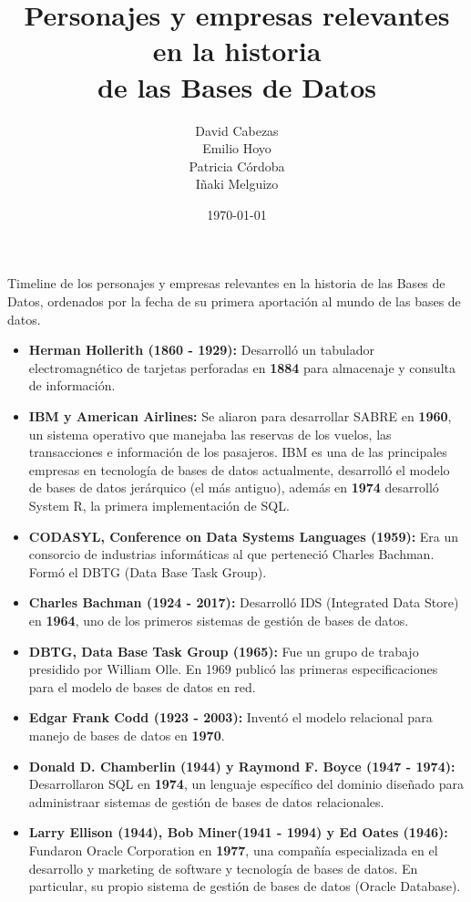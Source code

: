 \documentclass{article}
\title{\textbf{Personajes y empresas relevantes en la historia \\ de las Bases de Datos}}
\author{David Cabezas \\ Emilio Hoyo \\ Patricia Córdoba \\ Iñaki Melguizo}
\date{\today}
\begin{document}
\maketitle

Timeline de los personajes y empresas relevantes en la historia de las
Bases de Datos, ordenados por la fecha de su primera aportación al
mundo de las bases de datos.

\begin{itemize}
\item \textbf{Herman Hollerith (1860 - 1929):} Desarrolló un tabulador
  electromagnético de tarjetas perforadas en \textbf{1884} para almacenaje y
  consulta de información.

\item \textbf{IBM y American Airlines:} Se aliaron para desarrollar
  SABRE en \textbf{1960}, un sistema operativo que manejaba las
  reservas de los vuelos, las transacciones e información de los
  pasajeros. IBM es una de las principales empresas en tecnología de
  bases de datos actualmente, desarrolló el modelo de bases de datos
  jerárquico (el más antiguo), además en \textbf{1974} desarrolló
  System R, la primera implementación de SQL.

\item \textbf{CODASYL, Conference on Data Systems Languages (1959):}
  Era un consorcio de industrias informáticas al que perteneció
  Charles Bachman. Formó el DBTG (Data Base Task Group).
  
\item \textbf{Charles Bachman (1924 - 2017):} Desarrolló IDS (Integrated
  Data Store) en \textbf{1964}, uno de los primeros sistemas de gestión de
  bases de datos.

\item \textbf{DBTG, Data Base Task Group (1965):} Fue un grupo de
  trabajo presidido por William Olle. En 1969 publicó las primeras
  especificaciones para el modelo de bases de datos en red.
  
\item \textbf{Edgar Frank Codd (1923 - 2003):} Inventó el modelo
  relacional para manejo de bases de datos en \textbf{1970}.
  
\item \textbf{Donald D. Chamberlin (1944) y Raymond F. Boyce (1947 -
    1974):} Desarrollaron SQL en \textbf{1974}, un lenguaje específico
  del dominio diseñado para administraar sistemas de gestión de bases
  de datos relacionales.
  
\item \textbf{Larry Ellison (1944), Bob Miner(1941 - 1994) y Ed Oates
    (1946):} Fundaron Oracle Corporation en \textbf{1977}, una
  compañía especializada en el desarrollo y marketing de software y
  tecnología de bases de datos. En particular, su propio sistema de
  gestión de bases de datos (Oracle Database).


\end{itemize}
\end{document}
